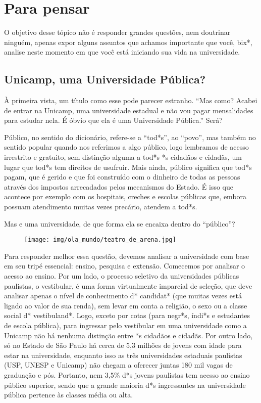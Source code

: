
\section{Para pensar}

O objetivo desse tópico não é responder grandes questões, nem doutrinar
ninguém, apenas expor alguns assuntos que achamos importante que você, bix*,
analise neste momento em que você está iniciando sua vida na universidade.

\subsection*{Unicamp, uma Universidade Pública?}

À primeira vista, um título como esse pode parecer estranho. ``Mas como? Acabei
de entrar na Unicamp, uma universidade estadual e não vou pagar mensalidades
para estudar nela. É óbvio que ela é uma Universidade Pública.'' Será?

Público, no sentido do dicionário, refere-se a ``tod*s'', ao ``povo'', mas
também no sentido popular quando nos referimos a algo público, logo lembramos
de acesso irrestrito e gratuito, sem distinção alguma a tod*s *s cidadãos e
cidadãs, um lugar que tod*s tem direitos de usufruir. Mais ainda, público
significa que tod*s pagam, que é gerido e que foi construído com o dinheiro de
todas as pessoas através dos impostos arrecadados pelos mecanismos do Estado. É
isso que acontece por exemplo com os hospitais, creches e escolas públicas que,
embora possuam atendimento muitas vezes precário, atendem a tod*s.

Mas e uma universidade, de que forma ela se encaixa dentro do ``público''?

\begin{figure}[h!]
    \centering
    \texttt{[image: img/ola\_mundo/teatro\_de\_arena.jpg]}
\end{figure}

Para responder melhor essa questão, devemos analisar a universidade com base em
seu tripé essencial: ensino, pesquisa e extensão. Comecemos por analisar o
acesso ao ensino. Por um lado, o processo seletivo da universidades públicas
paulistas, o vestibular, é uma forma virtualmente imparcial de seleção, que
deve analisar apenas o nível de conhecimento d* candidat* (que muitas vezes
está ligado ao valor de sua renda), sem levar em conta a religião, o sexo ou a
classe social d* vestibuland*. Logo, exceto por cotas (para negr*s, índi*s e
estudantes de escola pública), para ingressar pelo vestibular em uma
universidade como a Unicamp não há nenhuma distinção entre *s cidadãos e
cidadãs. Por outro lado, só no Estado de São Paulo há cerca de 5,3 milhões de
jovens com idade para estar na universidade, enquanto isso as três
universidades estaduais paulistas (USP, UNESP e Unicamp) não chegam a oferecer
juntas 180 mil vagas de graduação e pós. Portanto, nem 3,5\% d*s jovens
paulistas tem acesso ao ensino público superior, sendo que a grande maioria d*s
ingressantes na universidade pública pertence às classes média ou alta.

